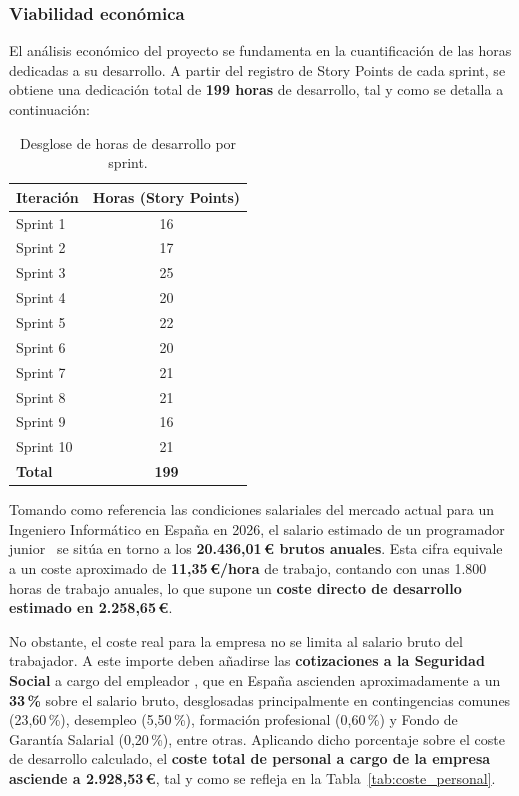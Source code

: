 \subsubsection*{Viabilidad económica}
El análisis económico del proyecto se fundamenta en la cuantificación de las horas
dedicadas a su desarrollo. A partir del registro de Story Points de cada sprint, se obtiene una dedicación total de
\textbf{199 horas} de desarrollo, tal y como se detalla a continuación:
\newpage
\begin{table}[H]
  \centering
  \begin{tabular}{lc}
    \toprule
    \textbf{Iteración} & \textbf{Horas (Story Points)} \\
    \midrule
    Sprint 1  & 16 \\
    Sprint 2  & 17 \\
    Sprint 3  & 25 \\
    Sprint 4  & 20 \\
    Sprint 5  & 22 \\
    Sprint 6  & 20 \\
    Sprint 7  & 21 \\
    Sprint 8  & 21 \\
    Sprint 9  & 16 \\
    Sprint 10 & 21 \\
    \midrule
    \textbf{Total} & \textbf{199} \\
    \bottomrule
  \end{tabular}
  \caption{Desglose de horas de desarrollo por sprint.}
\end{table}

Tomando como referencia las condiciones salariales del mercado actual para un
Ingeniero Informático en España en 2026, el salario estimado de un programador
junior~\cite{ilerna_salario_2024} se sitúa en torno a los \textbf{20.436,01\,€ brutos anuales}.
Esta cifra equivale a un coste aproximado de \textbf{11,35\,€/hora} de trabajo, contando
con unas 1.800 horas de trabajo anuales, lo que supone un \textbf{coste directo de
desarrollo estimado en 2.258,65\,€}.

No obstante, el coste real para la empresa no se limita al salario bruto del trabajador.
A este importe deben añadirse las \textbf{cotizaciones a la Seguridad Social} a cargo del empleador \cite{minsss2026cotizacion}, que en España ascienden aproximadamente a un \textbf{33\,\%} sobre el salario
bruto, desglosadas principalmente en contingencias comunes (23,60\,\%), desempleo
(5,50\,\%), formación profesional (0,60\,\%) y Fondo de Garantía Salarial (0,20\,\%), entre
otras. Aplicando dicho porcentaje sobre el coste de desarrollo calculado, el \textbf{coste
total de personal a cargo de la empresa asciende a 2.928,53\,€}, tal y como se
refleja en la Tabla~\ref{tab:coste_personal}.

